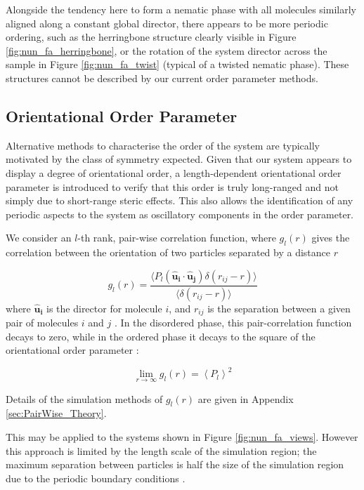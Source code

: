 \documentclass[11pt, a4paper]{article} %
\begin{document}
Alongside the tendency here to form a nematic phase with all molecules similarly aligned along a constant global director, there appears to be more periodic ordering, such as the herringbone structure clearly visible in Figure \ref{fig:nun_fa_herringbone}, or the rotation of the system director across the sample in Figure \ref{fig:nun_fa_twist} (typical of a twisted nematic phase). These structures cannot be described by our current order parameter methods.


\subsection{Orientational Order Parameter} \label{sec:PairWise_Application}
Alternative methods to characterise the order of the system are typically motivated by the class of symmetry expected. Given that our system appears to display a degree of orientational order, a length-dependent orientational order parameter is introduced to verify that this order is truly long-ranged and not simply due to short-range steric effects. This also allows the identification of any periodic aspects to the system as oscillatory components in the order parameter.

We consider an $l$-th rank, pair-wise correlation function, where $g_{l}(r)$ gives the correlation between the orientation of two particles separated by a distance $r$

\begin{equation} \label{eq:PairWise_eq}
g_{l}(r) = \frac{\langle P_{l}(\boldsymbol{\hat{u}_{i}}\cdot \boldsymbol{\hat{u}_{j}}) \delta(r_{ij}-r)\rangle}{\langle  \delta(r_{ij}-r) \rangle}
\end{equation} where $\boldsymbol{\hat{u}_{i}}$ is the director for molecule $i$, and $r_{ij}$ is the separation between a given pair of molecules $i$ and $j$ \cite{Zannoni1979}. In the disordered phase, this pair-correlation function decays to zero, while in the ordered phase it decays to the square of the orientational order parameter \cite{Frenkel1985b}:

\begin{equation}
\lim_{r \to \infty}g_{l}(r) = \left\langle P_{l} \right\rangle ^{2}
\end{equation}

Details of the simulation methods of $g_{l}(r)$ are given in Appendix \ref{sec:PairWise_Theory}. 

This may be applied to the systems shown in Figure \ref{fig:nun_fa_views}. However this approach is limited by the length scale of the simulation region; the maximum separation between particles is half the size of the simulation region due to the periodic boundary conditions \cite{Frenkel1985c}.
\end{document}

